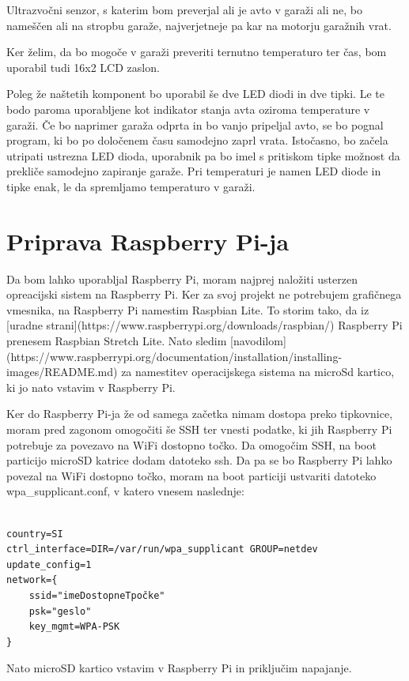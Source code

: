 \documentclass[11pt]{article}
\begin{document}
  Ultrazvočni senzor, s katerim bom preverjal ali je avto v garaži ali ne, bo nameščen ali na stropbu garaže, najverjetneje pa kar na motorju garažnih vrat.
  
  Ker želim, da bo mogoče v garaži preveriti ternutno temperaturo ter čas, bom uporabil tudi 16x2 LCD zaslon.
  
  Poleg že naštetih komponent bo uporabil še dve LED diodi in dve tipki. Le te bodo paroma uporabljene kot indikator stanja avta oziroma temperature v garaži. Če bo naprimer garaža odprta in bo vanjo pripeljal avto, se bo pognal program, ki bo po določenem času samodejno zaprl vrata. Istočasno, bo začela utripati ustrezna LED dioda, uporabnik pa bo imel s pritiskom tipke možnost da prekliče samodejno zapiranje garaže. Pri temperaturi je namen LED diode in tipke enak, le da spremljamo temperaturo v garaži.
\section{Priprava Raspberry Pi-ja}
 Da bom lahko uporabljal Raspberry Pi, moram najprej naložiti usterzen opreacijski sistem na Raspberry Pi. Ker za svoj projekt ne potrebujem grafičnega vmesnika, na Raspberry Pi namestim Raspbian Lite. To storim tako, da iz [uradne strani](https://www.raspberrypi.org/downloads/raspbian/) Raspberry Pi prenesem Raspbian Stretch Lite. Nato sledim [navodilom](https://www.raspberrypi.org/documentation/installation/installing-images/README.md) za namestitev operacijskega sistema na microSd kartico, ki jo nato vstavim v Raspberry Pi.
 
Ker do Raspberry Pi-ja že od samega začetka nimam dostopa preko tipkovnice, moram pred zagonom omogočiti še SSH ter vnesti podatke, ki jih Raspberry Pi potrebuje za povezavo na WiFi dostopno točko. Da omogočim SSH, na boot particijo microSD katrice dodam datoteko ssh. Da pa se bo Raspberry Pi lahko povezal na WiFi dostopno točko, moram na boot particiji ustvariti datoteko wpa\_supplicant.conf, v katero vnesem naslednje:

\begin{verbatim}
  
country=SI
ctrl_interface=DIR=/var/run/wpa_supplicant GROUP=netdev
update_config=1
network={
	ssid="imeDostopneTpočke"
	psk="geslo"
	key_mgmt=WPA-PSK
}
\end{verbatim}

Nato microSD kartico vstavim v Raspberry Pi in priključim napajanje.
\\
\end{document}
